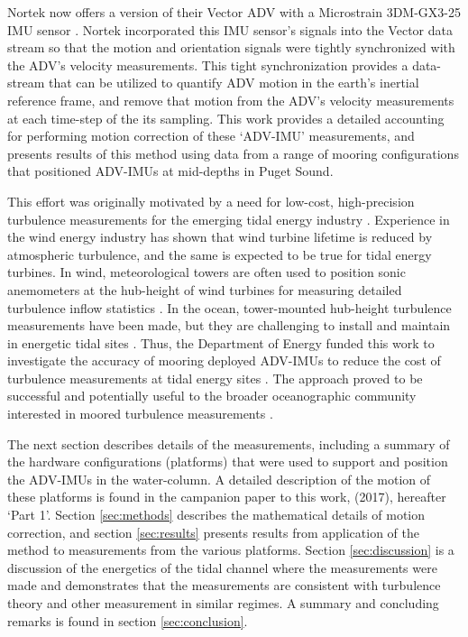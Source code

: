 Nortek now offers a version of their Vector ADV with a Microstrain 3DM-GX3-25 IMU sensor \cite[]{vector_manual2005, MicroStrain2012a}. Nortek incorporated this IMU sensor's signals into the Vector data stream so that the motion and orientation signals were tightly synchronized with the ADV's velocity measurements. This tight synchronization provides a data-stream that can be utilized to quantify ADV motion in the earth's inertial reference frame, and remove that motion from the ADV's velocity measurements at each time-step of the its sampling. This work provides a detailed accounting for performing motion correction of these `ADV-IMU' measurements, and presents results of this method using data from a range of mooring configurations that positioned ADV-IMUs at mid-depths in Puget Sound. 

This effort was originally motivated by a need for low-cost, high-precision turbulence measurements for the emerging tidal energy industry \cite[]{Mccaffrey++2015, Alexander+Hamlington2015}. Experience in the wind energy industry has shown that wind turbine lifetime is reduced by atmospheric turbulence, and the same is expected to be true for tidal energy turbines. In wind, meteorological towers are often used to position sonic anemometers at the hub-height of wind turbines for measuring detailed turbulence inflow statistics \cite[]{Hand++2003, Kelley++2005, Mucke++2011, Afgan++2013}. In the ocean, tower-mounted hub-height turbulence measurements have been made, but they are challenging to install and maintain in energetic tidal sites \cite[]{Gunawan++2014}. Thus, the Department of Energy funded this work to investigate the accuracy of mooring deployed ADV-IMUs to reduce the cost of turbulence measurements at tidal energy sites \cite[]{Kilcher++2016}. The approach proved to be successful and potentially useful to the broader oceanographic community interested in moored turbulence measurements \cite[]{Lueck+Huang1999, Doherty++1999, Nash++2004, Moum+Nash2009b, Alford2010, Paskyabi+Fer2013}.

The next section describes details of the measurements, including a summary of the hardware configurations (platforms) that were used to support and position the ADV-IMUs in the water-column. A detailed description of the motion of these platforms is found in the campanion paper to this work, \citeauthor{Harding++2017} (2017), hereafter `Part 1'. Section \ref{sec:methods} describes the mathematical details of motion correction, and section \ref{sec:results} presents results from application of the method to measurements from the various platforms. Section \ref{sec:discussion} is a discussion of the energetics of the tidal channel where the measurements were made and demonstrates that the measurements are consistent with turbulence theory and other measurement in similar regimes. A summary and concluding remarks is found in section \ref{sec:conclusion}.

